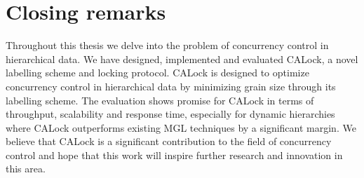 \section{Closing remarks}

Throughout this thesis we delve into the problem of concurrency control in hierarchical data. We have designed, implemented and evaluated CALock, a novel labelling scheme and locking protocol. CALock is designed to optimize concurrency control in hierarchical data by minimizing grain size through its labelling scheme. The evaluation shows promise for CALock in terms of throughput, scalability and response time, especially for dynamic hierarchies where CALock outperforms existing MGL techniques by a significant margin. We believe that CALock is a significant contribution to the field of concurrency control and hope that this work will inspire further research and innovation in this area.